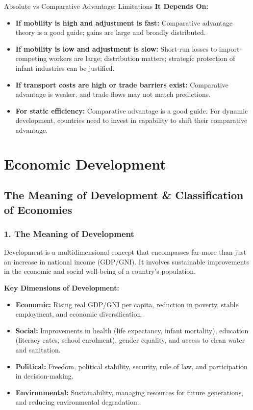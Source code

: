 \documentclass[11pt, a4paper, twoside]{book}
\begin{document}
\begin{evaluation}{Absolute vs Comparative Advantage: Limitations}
\textbf{It Depends On:}
\begin{itemize}
  \item \textbf{If mobility is high and adjustment is fast:} Comparative advantage theory is a good guide; gains are large and broadly distributed.
  \item \textbf{If mobility is low and adjustment is slow:} Short-run losses to import-competing workers are large; distribution matters; strategic protection of infant industries can be justified.
  \item \textbf{If transport costs are high or trade barriers exist:} Comparative advantage is weaker, and trade flows may not match predictions.
  \item \textbf{For static efficiency:} Comparative advantage is a good guide. For dynamic development, countries need to invest in capability to shift their comparative advantage.
\end{itemize}
\end{evaluation}

\section{Economic Development}

\subsection{The Meaning of Development \& Classification of Economies}

\subsubsection{1. The Meaning of Development}

Development is a multidimensional concept that encompasses far more than just an increase in national income (GDP/GNI). It involves sustainable improvements in the economic and social well-being of a country's population.

\textbf{Key Dimensions of Development:}
\begin{itemize}
  \item \textbf{Economic:} Rising real GDP/GNI per capita, reduction in poverty, stable employment, and economic diversification.
  \item \textbf{Social:} Improvements in health (life expectancy, infant mortality), education (literacy rates, school enrolment), gender equality, and access to clean water and sanitation.
  \item \textbf{Political:} Freedom, political stability, security, rule of law, and participation in decision-making.
  \item \textbf{Environmental:} Sustainability, managing resources for future generations, and reducing environmental degradation.
\end{itemize}
\end{document}
